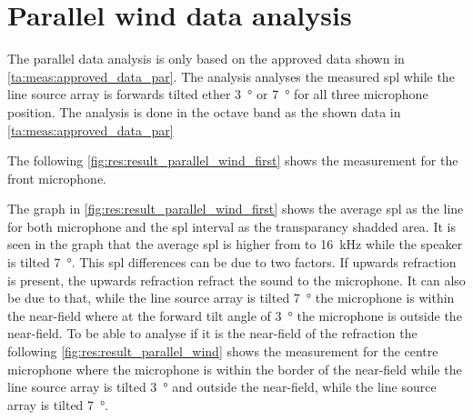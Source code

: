   

\section{Parallel wind data analysis}\label{res:par_data_ana}

The parallel data analysis is only based on the approved data shown in \autoref{ta:meas:approved_data_par}. The analysis analyses the measured \gls{spl} while the line source array is forwards tilted ether \SI{3}{\degree} or  \SI{7}{\degree} for all three microphone position. The analysis is done in the octave band as the shown data in \autoref{ta:meas:approved_data_par}

 The following \autoref{fig:res:result_parallel_wind_first}  shows the measurement for the front microphone.

  
The graph in \autoref{fig:res:result_parallel_wind_first} shows the average \gls{spl} as the line for both microphone and the \gls{spl} interval as the transparancy shadded area.
It is seen in the graph that the average \gls{spl} is higher from  to \SI{16}{\kilo\hertz} while the speaker is tilted \SI{7}{\degree}. This \gls{spl} differences can be due to two factors. If upwards refraction is present, the upwards refraction refract the sound to the microphone. It can also be due to that, while the line source array is tilted \SI{7}{\degree} the microphone is within the near-field where at the forward tilt angle of \SI{3}{\degree} the microphone is outside the near-field. To be able to analyse if it is the near-field of the refraction the following \autoref{fig:res:result_parallel_wind} shows the measurement for the centre microphone where the microphone is within the border of the near-field while the line source array is tilted \SI{3}{\degree} and outside the near-field, while the line source array is tilted \SI{7}{\degree}.
 
  
  
 
